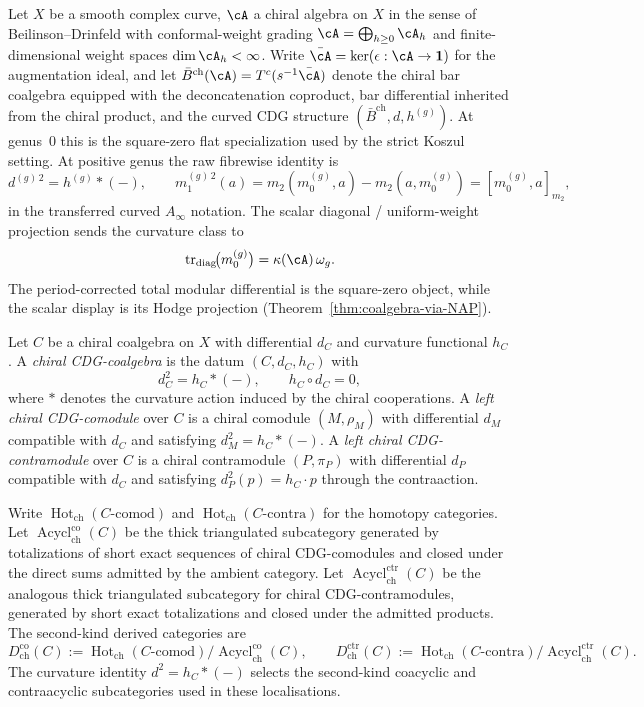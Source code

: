 Let $X$ be a smooth complex curve, $\cA$ a chiral algebra on $X$ in
the sense of Beilinson--Drinfeld with conformal-weight grading
$\cA = \bigoplus_{h \geq 0} \cA_h$ and finite-dimensional weight
spaces $\dim \cA_h < \infty$. Write
$\bar{\cA} = \ker(\epsilon: \cA \to \mathbf{1})$ for the augmentation
ideal, and let
$\bar{B}^{\mathrm{ch}}(\cA) = T^c(s^{-1} \bar{\cA})$
denote the chiral bar coalgebra equipped with the deconcatenation
coproduct, bar differential inherited from the chiral product, and
the curved CDG structure
$(\bar{B}^{\mathrm{ch}}, d, h^{(g)})$. At genus~$0$ this is the
square-zero flat specialization used by the strict Koszul setting. At
positive genus the raw fibrewise identity is
\[
 d^{(g)\,2}=h^{(g)}\ast(-),
 \qquad
 m_1^{(g)\,2}(a)
 =
 m_2(m_0^{(g)},a)-m_2(a,m_0^{(g)})
 =
 [m_0^{(g)},a]_{m_2},
\]
in the transferred curved \(A_\infty\) notation.  The scalar
diagonal / uniform-weight projection sends the curvature class to
\[
 \operatorname{tr}_{\mathrm{diag}}\!\bigl(m_0^{(g)}\bigr)
 =
 \kappa(\cA)\,\omega_g.
\]
The period-corrected total modular differential is the square-zero
object, while the scalar display is its Hodge projection
(Theorem~\ref{thm:coalgebra-via-NAP}).

\begin{definition}
\label{def:chiral-cdg-co-contra-theorem-b}
Let $C$ be a chiral coalgebra on $X$ with differential $d_C$ and
curvature functional $h_C$. A \emph{chiral CDG-coalgebra} is the datum
$(C,d_C,h_C)$ with
\[
d_C^2=h_C\ast(-),\qquad h_C\circ d_C=0,
\]
where $\ast$ denotes the curvature action induced by the chiral
cooperations. A \emph{left chiral CDG-comodule} over $C$ is a chiral
comodule $(M,\rho_M)$ with differential $d_M$ compatible with $d_C$
and satisfying $d_M^2=h_C\ast(-)$. A \emph{left chiral
CDG-contramodule} over $C$ is a chiral contramodule $(P,\pi_P)$ with
differential $d_P$ compatible with $d_C$ and satisfying
$d_P^2(p)=h_C\cdot p$ through the contraaction.

Write $\operatorname{Hot}_{\mathrm{ch}}(C\text{-}\mathrm{comod})$
and
$\operatorname{Hot}_{\mathrm{ch}}(C\text{-}\mathrm{contra})$ for the
homotopy categories. Let
$\operatorname{Acycl}^{\mathrm{co}}_{\mathrm{ch}}(C)$ be the thick
triangulated subcategory generated by totalizations of short exact
sequences of chiral CDG-comodules and closed under the direct sums
admitted by the ambient category. Let
$\operatorname{Acycl}^{\mathrm{ctr}}_{\mathrm{ch}}(C)$ be the
analogous thick triangulated subcategory for chiral
CDG-contramodules, generated by short exact totalizations and closed
under the admitted products. The second-kind derived categories are
\[
D^{\mathrm{co}}_{\mathrm{ch}}(C)
:=
\operatorname{Hot}_{\mathrm{ch}}(C\text{-}\mathrm{comod})
/
\operatorname{Acycl}^{\mathrm{co}}_{\mathrm{ch}}(C),
\qquad
D^{\mathrm{ctr}}_{\mathrm{ch}}(C)
:=
\operatorname{Hot}_{\mathrm{ch}}(C\text{-}\mathrm{contra})
/
\operatorname{Acycl}^{\mathrm{ctr}}_{\mathrm{ch}}(C).
\]
The curvature identity \(d^2=h_C\ast(-)\) selects the second-kind
coacyclic and contraacyclic subcategories used in these localisations.
\end{definition}

